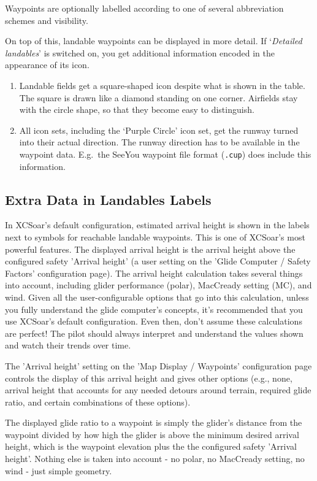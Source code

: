 Waypoints are optionally labelled according to one of several
abbreviation schemes  and visibility.

On top of this, landable waypoints can be displayed in more detail. If
`\emph{Detailed landables}' is switched on, you get additional information
encoded in the appearance of its icon.
\begin{enumerate}
\item  Landable fields get a square-shaped icon despite what is shown in the table.
  The square is drawn like a diamond standing on one corner. Airfields stay with the 
  circle shape, so that they become easy to distinguish.
\item  All icon sets, including the `Purple Circle' icon set, get the 
  runway turned into their actual direction. The runway direction has to be available in 
  the waypoint data. E.g.\ the SeeYou waypoint file format (\verb|.cup|) does
  include this information.  
\end{enumerate}

\subsection*{Extra Data in Landables Labels}
In XCSoar's default configuration, estimated arrival height is shown in the labels
next to symbols for reachable landable waypoints.
This is one of XCSoar's most powerful features.
The displayed arrival height is the arrival height above the
configured safety 'Arrival height'  (a user setting on
the 'Glide Computer / Safety Factors' configuration page).
The arrival height calculation takes several things into account, including
glider performance (polar), MacCready setting (MC), and wind.
Given all the user-configurable options that go into this calculation, unless you fully
understand the glide computer's concepts, it's recommended that you
\warning
use XCSoar's default configuration. Even then, don't assume
these calculations are perfect!
The pilot should always interpret and understand the values shown and watch their trends
over time.

The 'Arrival height' setting on the 'Map Display / Waypoints' configuration page
controls the display of this arrival height and gives other options (e.g., none,
arrival height that accounts for any needed detours around terrain, required glide ratio,
and certain combinations of these options).

The displayed glide ratio to a waypoint is simply the glider's distance
from the waypoint divided by how high the glider is above the minimum desired
arrival height, which is the waypoint elevation plus the
the configured safety 'Arrival height'.
Nothing else is taken into account - no polar, no MacCready
setting, no wind - just simple geometry.

